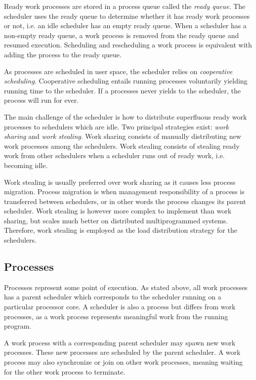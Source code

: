 Ready work processes are stored in a process queue called the \textit{ready queue}. The scheduler uses the ready queue to determine whether it has ready work processes or not, i.e. an idle scheduler has an empty ready queue. When a scheduler has a non\hyp{}empty ready queue, a work process is removed from the ready queue and resumed execution. Scheduling and rescheduling a work process is equivalent with adding the process to the ready queue.

As processes are scheduled in user space, the scheduler relies on \textit{cooperative scheduling}. Cooperative scheduling entails running processes voluntarily yielding running time to the scheduler. If a processes never yields to the scheduler, the process will run for ever. 

The main challenge of the scheduler is how to distribute superfluous ready work processes to schedulers which are idle. Two principal strategies exist: \textit{work sharing} and \textit{work stealing}. Work sharing consists of manually distributing new work processes among the schedulers. Work stealing consists of stealing ready work from other schedulers when a scheduler runs out of ready work, i.e. becoming idle. 

Work stealing is usually preferred over work sharing as it causes less process migration. Process migration is when management responsibility of a process is transferred between schedulers, or in other words the process changes its parent scheduler. Work stealing is however more complex to implement than work sharing, but scales much better on distributed multiprogrammed systems. Therefore, work stealing is employed as the load distribution strategy for the schedulers.


\subsection{Processes}


Processes represent some point of execution. As stated above, all work processes has a parent scheduler which corresponds to the scheduler running on a particular processor core. A scheduler is also a process but differs from work processes, as a work process represents meaningful work from the running program. 

A work process with a corresponding parent scheduler may spawn new work processes. These new processes are scheduled by the parent scheduler. A work process may also synchronize or join on other work processes, meaning waiting for the other work process to terminate. 


